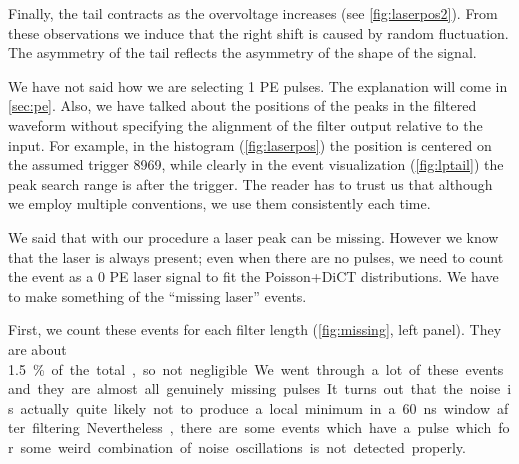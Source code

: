 \begin{figure}



\end{figure}

Finally, the tail contracts as the overvoltage increases (see
\autoref{fig:laserpos2}). From these observations we induce that the right
shift is caused by random fluctuation. The asymmetry of the tail reflects the
asymmetry of the shape of the signal.

We have not said how we are selecting 1 PE pulses. The explanation will come in
\autoref{sec:pe}. Also, we have talked about the positions of the peaks in the
filtered waveform without specifying the alignment of the filter output
relative to the input. For example, in the histogram (\autoref{fig:laserpos})
the position is centered on the assumed trigger 8969, while clearly in the
event visualization (\autoref{fig:lptail}) the peak search range is after the
trigger. The reader has to trust us that although we employ multiple
conventions, we use them consistently each time.

We said that with our procedure a laser peak can be missing. However we know
that the laser is always present; even when there are no pulses, we need to
count the event as a 0 PE laser signal to fit the Poisson+DiCT distributions.
We have to make something of the ``missing laser'' events.

First, we count these events for each filter length (\autoref{fig:missing},
left panel). They are about \SI{1.5}\% of the total, so not negligible. We went
through a lot of these events and they are almost all genuinely missing pulses.
It turns out that the noise is actually quite likely not to produce a local
minimum in a \SI{60}{ns} window after filtering. Nevertheless, there are some
events which have a pulse which for some weird combination of noise
oscillations is not detected properly.

\begin{figure}

    

\end{figure}

